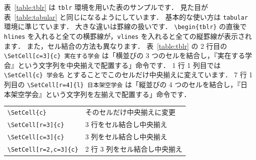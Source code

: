 表~\ref{table:tblr} は \verb|tblr| 環境を用いた表のサンプルです．
見た目が表~\ref{table:tabular} と同じになるようにしています．
基本的な使い方は \verb|tabular| 環境に準じています．
大きな違いは罫線の扱いです．
\verb|\begin{tblr}| の直後で \verb|hlines| を入れると全ての横罫線が，\verb|vlines| を入れると全ての縦罫線が表示されます．
また，セル結合の方法も異なります．
表~\ref{table:tblr} の 2 行目の \verb|\SetCell[c=3]{c} 実在する学会| は「横並びの 3 つのセルを結合し，『実在する学会』という文字列を中央揃えで配置する」命令です．
1 行 1 列目では \verb|\SetCell{c} 学会名| とすることでこのセルだけ中央揃えに変えています．
7 行 1 列目の \verb|\SetCell[r=4]{l} 日本架空学会| は「縦並びの 4 つのセルを結合し，『日本架空学会』という文字列を左揃えで配置する」命令です．

\begin{tcolorbox}[enhanced, title={\texttt{tblr} 環境でセル結合する際に使用するコマンド}, drop fuzzy shadow]
    \begin{tabular}{ll}
        \verb|\SetCell{c}|   & そのセルだけ中央揃えに変更 \\
        \verb|\SetCell[r=3]{c}|  & 3 行をセル結合し中央揃え \\
        \verb|\SetCell[c=3]{c}|  & 3 列をセル結合し中央揃え \\
        \verb|\SetCell[r=2,c=3]{c}|  & 2 行 3 列をセル結合し中央揃え \\
    \end{tabular}
\end{tcolorbox}

